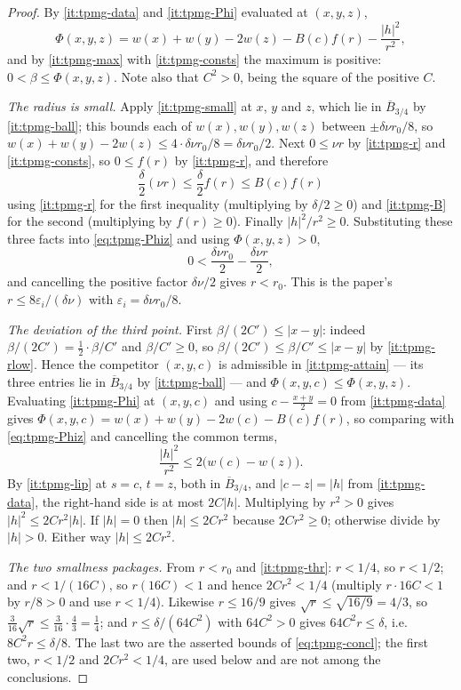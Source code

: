 \begin{proof}
By \ref{it:tpmg-data} and \ref{it:tpmg-Phi} evaluated at $(x,y,z)$,
\begin{equation}\label{eq:tpmg-Phiz}
  \Phi(x,y,z)=w(x)+w(y)-2w(z)-B(c)f(r)-\frac{|h|^2}{r^2},
\end{equation}
and by \ref{it:tpmg-max} with \ref{it:tpmg-consts} the maximum is positive:
$0<\beta\le\Phi(x,y,z)$. Note also that $C^2>0$, being the square of the
positive $C$.

\emph{The radius is small.} Apply \ref{it:tpmg-small} at $x$, $y$ and $z$, which
lie in $\overline B_{3/4}$ by \ref{it:tpmg-ball}; this bounds each of
$w(x),w(y),w(z)$ between $\pm\delta\nu r_0/8$, so
$w(x)+w(y)-2w(z)\le4\cdot\delta\nu r_0/8=\delta\nu r_0/2$. Next
$0\le\nu r$ by \ref{it:tpmg-r} and \ref{it:tpmg-consts}, so $0\le f(r)$ by
\ref{it:tpmg-r}, and therefore
\[
  \frac\delta2(\nu r)\le\frac\delta2f(r)\le B(c)f(r)
\]
using \ref{it:tpmg-r} for the first inequality (multiplying by
$\delta/2\ge0$) and \ref{it:tpmg-B} for the second (multiplying by
$f(r)\ge0$). Finally $|h|^2/r^2\ge0$. Substituting these three facts into
\eqref{eq:tpmg-Phiz} and using $\Phi(x,y,z)>0$,
\[
  0<\frac{\delta\nu r_0}{2}-\frac{\delta\nu r}{2},
\]
and cancelling the positive factor $\delta\nu/2$ gives $r<r_0$. This is the
paper's $r\le8\varepsilon_i/(\delta\nu)$ with $\varepsilon_i=\delta\nu r_0/8$.

\emph{The deviation of the third point.} First
$\beta/(2C')\le|x-y|$: indeed $\beta/(2C')=\tfrac12\cdot\beta/C'$ and
$\beta/C'\ge0$, so $\beta/(2C')\le\beta/C'\le|x-y|$ by \ref{it:tpmg-rlow}.
Hence the competitor $(x,y,c)$ is admissible in \ref{it:tpmg-attain} --- its
three entries lie in $\overline B_{3/4}$ by \ref{it:tpmg-ball} --- and
$\Phi(x,y,c)\le\Phi(x,y,z)$. Evaluating \ref{it:tpmg-Phi} at $(x,y,c)$ and using
$c-\frac{x+y}{2}=0$ from \ref{it:tpmg-data} gives
$\Phi(x,y,c)=w(x)+w(y)-2w(c)-B(c)f(r)$, so comparing with
\eqref{eq:tpmg-Phiz} and cancelling the common terms,
\[
  \frac{|h|^2}{r^2}\le2\bigl(w(c)-w(z)\bigr).
\]
By \ref{it:tpmg-lip} at $s=c$, $t=z$, both in $\overline B_{3/4}$, and
$|c-z|=|h|$ from \ref{it:tpmg-data}, the right-hand side is at most $2C|h|$.
Multiplying by $r^2>0$ gives $|h|^2\le2Cr^2|h|$. If $|h|=0$ then
$|h|\le2Cr^2$ because $2Cr^2\ge0$; otherwise divide by $|h|>0$. Either way
$|h|\le2Cr^2$.

\emph{The two smallness packages.} From $r<r_0$ and \ref{it:tpmg-thr}:
$r<1/4$, so $r<1/2$; and $r<1/(16C)$, so $r(16C)<1$ and hence
$2Cr^2<1/4$ (multiply $r\cdot16C<1$ by $r/8>0$ and use $r<1/4$). Likewise
$r\le16/9$ gives $\sqrt r\le\sqrt{16/9}=4/3$, so
$\tfrac3{16}\sqrt r\le\tfrac3{16}\cdot\tfrac43=\tfrac14$; and
$r\le\delta/(64C^2)$ with $64C^2>0$ gives $64C^2r\le\delta$, i.e.
$8C^2r\le\delta/8$. The last two are the asserted bounds of
\eqref{eq:tpmg-concl}; the first two, $r<1/2$ and $2Cr^2<1/4$, are used below
and are not among the conclusions.


\end{proof}
